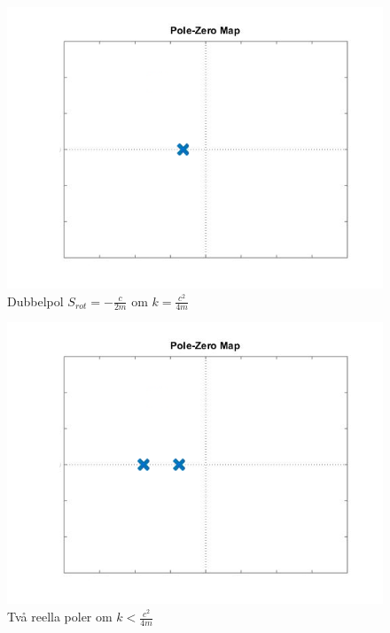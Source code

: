 \documentclass[10pt,a4paper]{article}
\begin{document}
\begin{figure}
\begin{center}
\includegraphics[scale=0.3]{1reell}
\caption{Dubbelpol $S_{rot}=-\frac{c}{2m}$ om $k=\frac{c^2}{4m}$}
\end{center}
\end{figure}

\begin{figure}
\begin{center}
\includegraphics[scale=0.3]{2reella}
\caption{Två reella poler om $k<\frac{c^2}{4m}$}
\end{center}
\end{figure}
\end{document}
